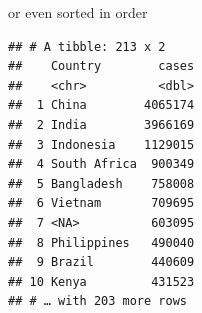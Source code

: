 \documentclass[ignorenonframetext,]{beamer}
\newenvironment{Shaded}{\begin{snugshade}}{\end{snugshade}}
\newcommand{\DataTypeTok}[1]{\textcolor[rgb]{0.13,0.29,0.53}{#1}}
\newcommand{\KeywordTok}[1]{\textcolor[rgb]{0.13,0.29,0.53}{\textbf{#1}}}
\newcommand{\NormalTok}[1]{#1}
\newcommand{\OperatorTok}[1]{\textcolor[rgb]{0.81,0.36,0.00}{\textbf{#1}}}
\newcommand{\StringTok}[1]{\textcolor[rgb]{0.31,0.60,0.02}{#1}}
\begin{document}
\begin{frame}[fragile]{or even sorted in order}
\protect\hypertarget{or-even-sorted-in-order}{}

\begin{Shaded}
\end{Shaded}

\begin{verbatim}
## # A tibble: 213 x 2
##    Country        cases
##    <chr>          <dbl>
##  1 China        4065174
##  2 India        3966169
##  3 Indonesia    1129015
##  4 South Africa  900349
##  5 Bangladesh    758008
##  6 Vietnam       709695
##  7 <NA>          603095
##  8 Philippines   490040
##  9 Brazil        440609
## 10 Kenya         431523
## # … with 203 more rows
\end{verbatim}

\end{frame}
\end{document}
